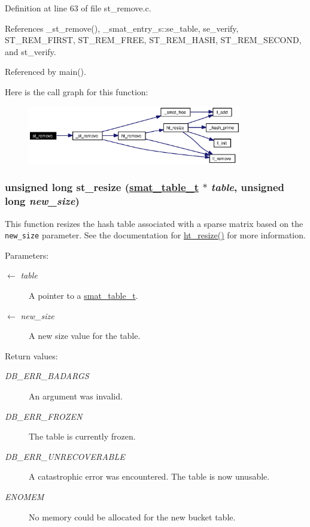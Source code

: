 Definition at line 63 of file st\_\-remove.c.

References \_\-st\_\-remove(), \_\-smat\_\-entry\_\-s::se\_\-table, se\_\-verify, ST\_\-REM\_\-FIRST, ST\_\-REM\_\-FREE, ST\_\-REM\_\-HASH, ST\_\-REM\_\-SECOND, and st\_\-verify.

Referenced by main().

Here is the call graph for this function:\begin{figure}[H]
\begin{center}
\leavevmode
\includegraphics[width=265pt]{group__dbprim__smat_ga14_cgraph}
\end{center}
\end{figure}
\hypertarget{group__dbprim__smat_ga18}{
\subsubsection[st\_\-resize]{\setlength{\rightskip}{0pt plus 5cm}unsigned long st\_\-resize (\hyperlink{struct__smat__table__s}{smat\_\-table\_\-t} $\ast$ {\em table}, unsigned long {\em new\_\-size})}}
\label{group__dbprim__smat_ga18}


This function resizes the hash table associated with a sparse matrix based on the {\tt new\_\-size} parameter. See the documentation for \hyperlink{group__dbprim__hash_ga16}{ht\_\-resize()} for more information.

\begin{Desc}
\item[Parameters:]
\begin{description}
\item[\mbox{$\leftarrow$} {\em table}]A pointer to a \hyperlink{group__dbprim__smat_ga0}{smat\_\-table\_\-t}. \item[\mbox{$\leftarrow$} {\em new\_\-size}]A new size value for the table.\end{description}
\end{Desc}
\begin{Desc}
\item[Return values:]
\begin{description}
\item[{\em DB\_\-ERR\_\-BADARGS}]An argument was invalid. \item[{\em DB\_\-ERR\_\-FROZEN}]The table is currently frozen. \item[{\em DB\_\-ERR\_\-UNRECOVERABLE}]A catastrophic error was encountered. The table is now unusable. \item[{\em ENOMEM}]No memory could be allocated for the new bucket table.\end{description}
\end{Desc}



